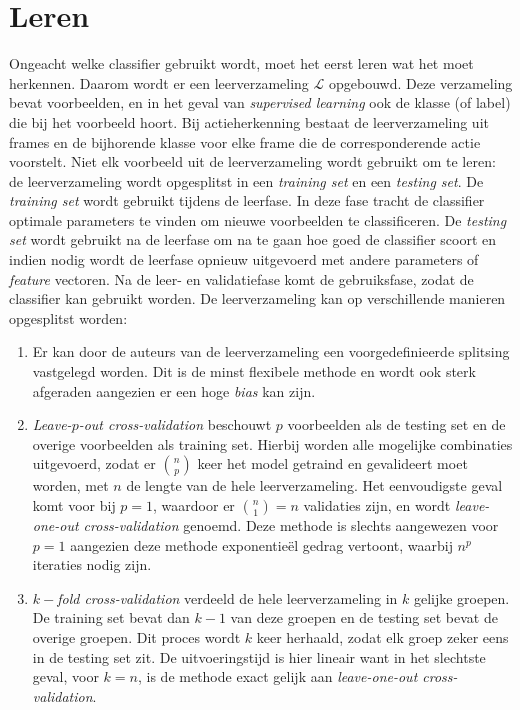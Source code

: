\section{Leren}
Ongeacht welke classifier gebruikt wordt, moet het eerst leren wat het moet herkennen. Daarom wordt er een leerverzameling $\mathcal{L}$ opgebouwd. Deze verzameling bevat voorbeelden, en in het geval van \textit{supervised learning} ook de klasse (of label) die bij het voorbeeld hoort. Bij actieherkenning bestaat de leerverzameling uit frames en de bijhorende klasse voor elke frame die de corresponderende actie voorstelt. Niet elk voorbeeld uit de leerverzameling wordt gebruikt om te leren: de leerverzameling wordt opgesplitst in een \textit{training set} en een \textit{testing set}. De \textit{training set} wordt gebruikt tijdens de leerfase. In deze fase tracht de classifier optimale parameters te vinden om nieuwe voorbeelden te classificeren. De \textit{testing set} wordt gebruikt na de leerfase om na te gaan hoe goed de classifier scoort en indien nodig wordt de leerfase opnieuw uitgevoerd met andere parameters of \textit{feature} vectoren. Na de leer- en validatiefase komt de gebruiksfase, zodat de classifier kan gebruikt worden. De leerverzameling kan op verschillende manieren opgesplitst worden:
\begin{enumerate}
	\item Er kan door de auteurs van de leerverzameling een voorgedefinieerde splitsing vastgelegd worden. Dit is de minst flexibele methode en wordt ook sterk afgeraden aangezien er een hoge \textit{bias} kan zijn. 
	\item \textit{Leave-$p$-out cross-validation} beschouwt $p$ voorbeelden als de testing set en de overige voorbeelden als training set. Hierbij worden alle mogelijke combinaties uitgevoerd, zodat er $\binom{n}{p}$ keer het model getraind en gevalideert moet worden, met $n$ de lengte van de hele leerverzameling. Het eenvoudigste geval komt voor bij $p = 1$, waardoor er $\binom{n}{1} = n$ validaties zijn, en wordt \textit{leave-one-out cross-validation} genoemd. Deze methode is slechts aangewezen voor $p = 1$ aangezien deze methode  exponentieël gedrag vertoont, waarbij $n^p$ iteraties nodig zijn.
	
	\item \textit{$k-$fold cross-validation} verdeeld de hele leerverzameling in $k$ gelijke groepen. De training set bevat dan $k - 1$ van deze groepen en de testing set bevat de overige groepen. Dit proces wordt $k$ keer herhaald, zodat elk groep zeker eens in de testing set zit. De uitvoeringstijd is hier lineair want in het slechtste geval, voor $k = n$, is de methode exact gelijk aan  \textit{leave-one-out cross-validation}.
\end{enumerate} 

